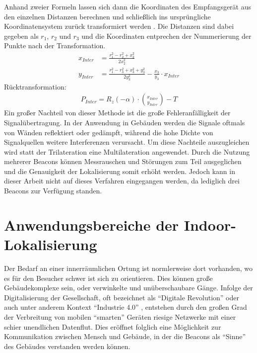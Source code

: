 Anhand zweier Formeln lassen sich dann die Koordinaten des Empfangsgerät aus den einzelnen Distanzen berechnen und schließlich ins ursprüngliche Koordinatensystem zurück transformiert werden \cite{Trilat}. Die Distanzen sind dabei gegeben als $r_1$, $r_2$ und $r_3$ und die Koordinaten entprechen der Nummerierung der Punkte nach der Transformation.
\begin{align*}
x_{Inter} &= \frac{r_1^2-r_2^2+x_2^2}{2x_2^2}\\
y_{Inter} &= \frac{r_1^2-r_3^2+x_3^2+y_3^2}{2y_3^2}-\frac{x_3}{y_3}\cdot x_{Inter}
\end{align*}
Rücktransformation:
\begin{align*}
P_{Inter} = R_z\left ( -\alpha \right ) \cdot \binom{x_{Inter}}{y_{Inter}} - T
\end{align*}
Ein großer Nachteil von dieser Methode ist die große Fehleranfälligkeit der Signalübertragung. In der Anwendung in Gebäuden werden die Signale oftmals von Wänden reflektiert oder gedämpft, während die hohe Dichte von Signalquellen weitere Interferenzen verursacht. Um diese Nachteile auszugleichen wird statt der Trilateration eine Multilateration angewendet. Durch die Nutzung mehrerer Beacons können Messrauschen und Störungen zum Teil ausgeglichen und die Genauigkeit der Lokalisierung somit erhöht werden. Jedoch kann in dieser Arbeit nicht auf dieses Verfahren eingegangen werden, da lediglich drei Beacons zur Verfügung standen. 

\section{Anwendungsbereiche der Indoor-Lokalisierung}
Der Bedarf an einer innerräumlichen Ortung ist normlerweise dort vorhanden, wo es für den Besucher schwer ist sich zu orientieren. Dies können große Gebäudekomplexe sein, oder verwinkelte und unüberschaubare Gänge. Infolge der Digitalisierung der Gesellschaft, oft bezeichnet als "`Digitale Revolution"' oder auch unter anderem Kontext "`Industrie 4.0"' \cite{DigRev}, entstehen durch den großen Grad der Verbreitung von mobilen "`smarten"' Geräten riesige Netzwerke mit einer schier unendlichen Datenflut. Dies eröffnet folglich eine Möglichkeit zur Kommunikation zwischen Mensch und Gebäude, in der die Beacons als "`Sinne"' des Gebäudes verstanden werden können.  
